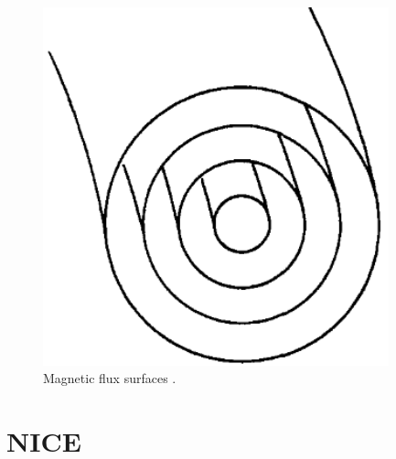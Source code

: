 \begin{figure}
  \centering
  \includegraphics[width=10cm]{images/fluxsurf.png}
  \caption{Magnetic flux surfaces \cite{wessontokamak}.}
  \label{fig:magfluxsurf}
\end{figure}

\section{NICE}

